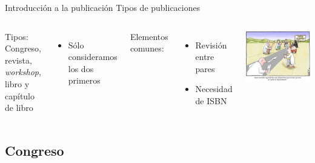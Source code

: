\documentclass{beamer}
\begin{document}
\begin{frame}{Introducción a la publicación} {Tipos de publicaciones}
	\begin{columns}
		Tipos: Congreso, revista, \textit{workshop}, libro y capítulo de libro
			\begin{itemize}
			\item Sólo consideramos los dos primeros
			\end{itemize}
		Elementos comunes:
		\begin{itemize}
			\item \alert{Revisión entre pares}
			\item Necesidad de \alert{ISBN}
		\end{itemize}

	 	\begin{center}
	  	  \includegraphics[width=\linewidth]{figs/peerReview.jpg}
 	 	\end{center}
	 \end{columns}
\end{frame}

\subsection{Congreso}
\end{document}
